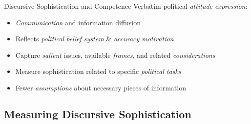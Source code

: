 \begin{frame}{Discursive Sophistication and Competence}
Verbatim political \emph{attitude expression}:
\begin{itemize}[<+->]
\item \emph{Communication} and information diffusion
\item Reflects \emph{political belief system} \& \emph{accuracy motivation}
\item Capture \emph{salient} issues, available \emph{frames}, and related \emph{considerations}
\item Measure sophistication related to specific \emph{political tasks}
\item Fewer \emph{assumptions} about necessary pieces of information
\end{itemize}\vspace{2em}
\end{frame}



\subsection{Measuring Discursive Sophistication}

